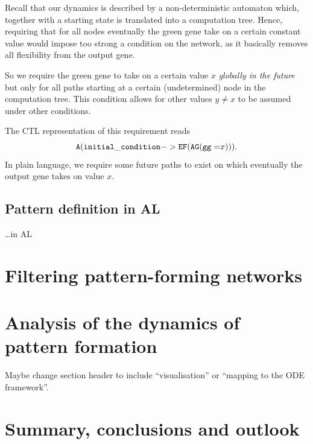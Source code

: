 \documentclass{article}
\begin{document}
\begin{flushleft}
Recall that our dynamics is described by a non-deterministic automaton which,
together with a starting state is translated into a computation tree. Hence,
requiring that for all nodes eventually the green gene take on a certain
constant value would impose too strong a condition on the network, as it
basically removes all flexibility from the output gene.

So we require the green gene to take on a certain value $x$
{\it globally in the future} but only for all paths starting at a certain
(undetermined) node in the computation tree. This condition allows for other
values $y\neq x$ to be assumed under other conditions.

The CTL representation of this requirement reads
\begin{equation}
{\tt A(initial\_condition  -> EF(AG(gg=}x{\tt )))}.
\end{equation}
In plain language, we require some future paths to exist on which
eventually the output gene takes on value $x$. 

\subsection{Pattern definition in AL}

\ldots in AL

\section{Filtering pattern-forming networks}

\section{Analysis of the dynamics of pattern formation}

Maybe change section header to include ``visualisation'' or ``mapping to the ODE
framework''.

\section{Summary, conclusions and outlook}


\begin{figure}
\end{figure}
\end{flushleft}
\end{document}
